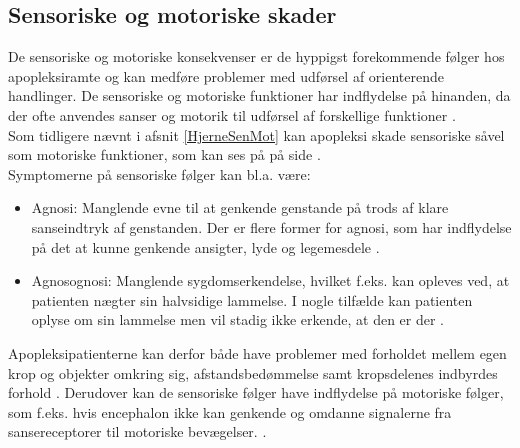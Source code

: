 \subsection{Sensoriske og motoriske skader} %
De sensoriske og motoriske konsekvenser er de hyppigst forekommende følger hos apopleksiramte og kan medføre problemer med udførsel af orienterende handlinger. \cite{Kruuse2015a,DSfA2009}  De sensoriske og motoriske funktioner har indflydelse på hinanden, da der ofte anvendes sanser og motorik til udførsel af forskellige funktioner \cite{Nichols1997}.  \\
Som tidligere nævnt i afsnit \ref{HjerneSenMot} kan apopleksi skade sensoriske såvel som motoriske funktioner, som kan ses på  på side \pageref{Enc} .\\

\noindent Symptomerne på sensoriske følger kan bl.a. være:
\begin{itemize}
  \item Agnosi: Manglende evne til at genkende genstande på trods af klare sanseindtryk af genstanden. Der er flere former for agnosi, som har indflydelse på det at kunne genkende ansigter, lyde og legemesdele \cite{Redaktionen2015}. 
 \item Agnosognosi: Manglende sygdomserkendelse, hvilket f.eks. kan opleves ved, at patienten nægter sin halvsidige lammelse. I nogle tilfælde kan patienten oplyse om sin lammelse men vil stadig ikke erkende, at den er der \cite{Pedersen1999}.
\end{itemize}
Apopleksipatienterne kan derfor både have problemer med forholdet mellem egen krop og objekter omkring sig, afstandsbedømmelse samt kropsdelenes indbyrdes forhold \cite{Kruuse2015a,DSfA2009}. Derudover kan de sensoriske følger have indflydelse på motoriske følger, som f.eks. hvis encephalon ikke kan genkende og omdanne signalerne fra sansereceptorer til motoriske bevægelser. \cite{Martini2012,Nichols1997}. \\

